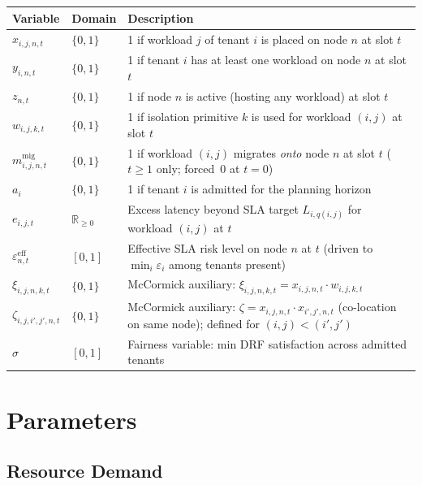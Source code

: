 \documentclass[11pt,a4paper]{article}
\newcommand{\eps}{\varepsilon}          %
\begin{document}
\begin{longtable}{@{}p{4.2cm}p{2.1cm}p{8.0cm}@{}}
  \toprule
  \textbf{Variable} & \textbf{Domain} & \textbf{Description} \\
  \midrule
  \endhead
  $x_{i,j,n,t}$ & $\{0,1\}$
    & 1 if workload $j$ of tenant $i$ is placed on node $n$ at slot $t$ \\[3pt]
  $y_{i,n,t}$ & $\{0,1\}$
    & 1 if tenant $i$ has at least one workload on node $n$ at slot $t$ \\[3pt]
  $z_{n,t}$ & $\{0,1\}$
    & 1 if node $n$ is active (hosting any workload) at slot $t$ \\[3pt]
  $w_{i,j,k,t}$ & $\{0,1\}$
    & 1 if isolation primitive $k$ is used for workload $(i,j)$ at slot $t$ \\[3pt]
  $m_{i,j,n,t}^{\text{mig}}$ & $\{0,1\}$
    & 1 if workload $(i,j)$ migrates \emph{onto} node $n$ at slot $t$
      ($t\ge 1$ only; forced~$0$ at $t=0$) \\[3pt]
  $a_i$ & $\{0,1\}$
    & 1 if tenant $i$ is admitted for the planning horizon \\[3pt]
  $e_{i,j,t}$ & $\mathbb{R}_{\ge 0}$
    & Excess latency beyond SLA target $L_{i,q(i,j)}$ for workload $(i,j)$ at $t$ \\[3pt]
  $\eps_{n,t}^{\text{eff}}$ & $[0,1]$
    & Effective SLA risk level on node $n$ at $t$
      (driven to $\min_i \eps_i$ among tenants present) \\[3pt]
  $\xi_{i,j,n,k,t}$ & $\{0,1\}$
    & McCormick auxiliary: $\xi_{i,j,n,k,t} = x_{i,j,n,t}\cdot w_{i,j,k,t}$ \\[3pt]
  $\zeta_{i,j,i',j',n,t}$ & $\{0,1\}$
    & McCormick auxiliary: $\zeta = x_{i,j,n,t}\cdot x_{i',j',n,t}$
      (co-location on same node); defined for $(i,j)<(i',j')$ \\[3pt]
  $\sigma$ & $[0,1]$
    & Fairness variable: min DRF satisfaction across admitted tenants \\
  \bottomrule
\end{longtable}

\section{Parameters}

\subsection{Resource Demand}
\end{document}
